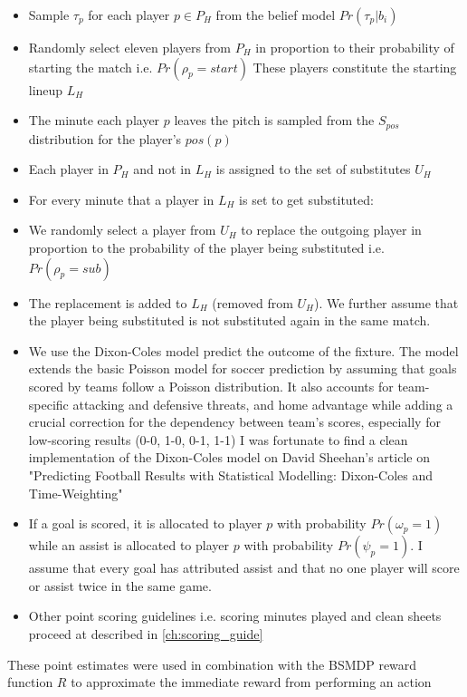 \begin{itemize}
    \item Sample $\tau_p$ for each player $p \in P_H$  from the belief model $Pr(\tau_p | b_i)$
    \item Randomly select eleven players from $P_H$ in proportion to their probability of starting the match i.e. $Pr(\rho_p = start)$ These players constitute the starting lineup $L_H$
    \item The minute each player $p$ leaves the pitch is sampled from the $S_{pos}$ distribution for the player's $pos(p)$
    \item Each player in $P_H$ and not in $L_H$ is assigned to the set of substitutes $U_H$
    \item For every minute that a player in $L_H$ is set to get substituted:
        \item We randomly select a player from $U_H$ to replace the outgoing player in proportion to the probability of the player being substituted i.e. $Pr(\rho_p = sub)$
        \item The replacement is added to $L_H$ (removed from $U_H$). We further assume that the player being substituted is not substituted again in the same match.
    \item We use the Dixon-Coles model \cite{dixon1997} predict the outcome of the fixture. The model extends the basic Poisson model for soccer prediction by assuming that goals scored by teams follow a Poisson distribution. It also accounts for team-specific attacking and defensive threats, and home advantage while adding a crucial correction for the dependency between team's scores, especially for low-scoring results (0-0, 1-0, 0-1, 1-1) I was fortunate to find a clean implementation of the Dixon-Coles model on David Sheehan's article on "Predicting Football Results with Statistical Modelling: Dixon-Coles and Time-Weighting" \cite{sheehan2018}
    \item If a goal is scored, it is allocated to player $p$ with probability $Pr(\omega_p = 1)$ while an assist is allocated to player $p$ with probability $Pr(\psi_p = 1)$. I assume that every goal has attributed assist and that no one player will score or assist twice in the same game.
    
    \item Other point scoring guidelines i.e. scoring minutes played and clean sheets proceed at described in \ref{ch:scoring_guide}
\end{itemize}
These point estimates were used in combination with the BSMDP reward function $R$ to approximate the immediate reward from performing an action

